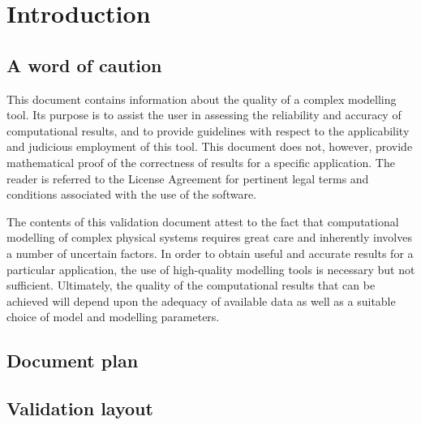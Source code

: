 \section{Introduction}
\subsection{A word of caution}
This document contains information about the quality of a complex modelling tool. Its purpose is to assist the user in assessing the reliability and accuracy of computational results, and to provide guidelines with respect to the applicability and judicious employment of this tool. This document does not, however, provide mathematical proof of the correctness of results for a specific application. The reader is referred to the License Agreement for pertinent legal terms and conditions associated with the use of the software.

The contents of this validation document attest to the fact that computational modelling of complex physical systems requires great care and inherently involves a number of uncertain factors. In order to obtain useful and accurate results for a particular application, the use of high-quality modelling tools is necessary but not sufficient. Ultimately, the quality of the computational results that can be achieved will depend upon the adequacy of available data as well as a suitable choice of model and modelling parameters.
% 
\subsection{Document plan}

\subsection{Validation layout}

